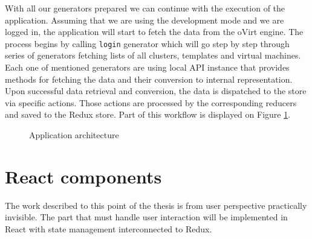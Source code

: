 With all our generators prepared we can continue with the execution of the application. Assuming that we are using the development mode and we are logged in, the application will start to fetch the data from the oVirt engine. The process begins by calling \texttt{login} generator which will go step by step through series of generators fetching lists of all clusters, templates and virtual machines. Each one of mentioned generators are using local API instance that provides methods for fetching the data and their conversion to internal representation. Upon successful data retrieval and conversion, the data is dispatched to the store via specific actions. Those actions are processed by the corresponding reducers and saved to the Redux store. Part of this workflow is displayed on 
Figure \ref{app_architecture}.

\begin{figure}[h]
\caption{Application architecture}
\label{app_architecture}
\end{figure}

\section{React components}
The work described to this point of the thesis is from user perspective practically invisible. The part that must handle user interaction will be implemented in React with state management interconnected to Redux. 

